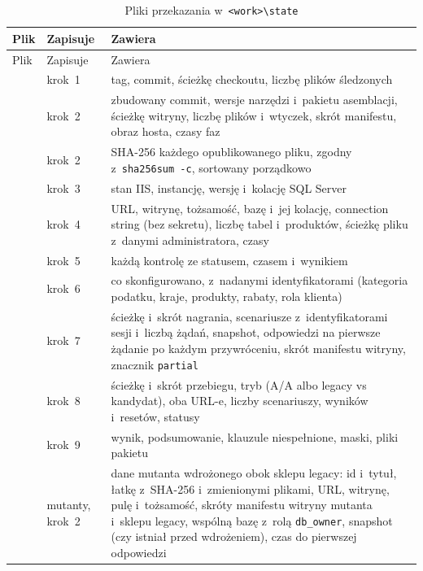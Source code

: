{\footnotesize
\begin{xltabular}{\linewidth}{@{}>{\raggedright\arraybackslash}p{3.4cm} l >{\raggedright\arraybackslash}X@{}}
\caption{Pliki przekazania w~\texttt{<work>\textbackslash{}state}}\label{tab:bench-state}\\
\toprule
Plik & Zapisuje & Zawiera \\
\midrule
\endfirsthead
\toprule
Plik & Zapisuje & Zawiera \\
\midrule
\endhead
\bottomrule
\endlastfoot
{} & krok~1 & tag, commit, ścieżkę checkoutu, liczbę plików śledzonych \\
 & krok~2 & zbudowany commit, wersje narzędzi i~pakietu asemblacji,
  ścieżkę witryny, liczbę plików i~wtyczek, skrót manifestu, obraz hosta, czasy faz \\
 & krok~2 & SHA-256 każdego opublikowanego pliku, zgodny
  z~\texttt{sha256sum -c}, sortowany porządkowo \\
 & krok~3 & stan IIS, instancję, wersję i~kolację SQL Server \\
 & krok~4 & URL, witrynę, tożsamość, bazę i~jej kolację, connection
  string (bez sekretu), liczbę tabel i~produktów, ścieżkę pliku z~danymi administratora,
  czasy \\
 & krok~5 & każdą kontrolę ze statusem, czasem i~wynikiem \\
 & krok~6 & co skonfigurowano, z~nadanymi identyfikatorami
  (kategoria podatku, kraje, produkty, rabaty, rola klienta) \\
 & krok~7 & ścieżkę i~skrót nagrania, scenariusze z~identyfikatorami
  sesji i~liczbą żądań, snapshot, odpowiedzi na pierwsze żądanie po każdym przywróceniu,
  skrót manifestu witryny, znacznik \texttt{partial} \\
 & krok~8 & ścieżkę i~skrót przebiegu, tryb (A/A albo legacy vs
  kandydat), oba URL-e, liczby scenariuszy, wyników i~resetów, statusy \\
 & krok~9 & wynik, podsumowanie, klauzule niespełnione, maski, pliki
  pakietu \\
 & mutanty, krok~2 & dane mutanta wdrożonego obok sklepu legacy:
  id i~tytuł, łatkę z~SHA-256 i~zmienionymi plikami, URL, witrynę, pulę i~tożsamość, skróty
  manifestu witryny mutanta i~sklepu legacy, wspólną bazę z~rolą \texttt{db\_owner},
  snapshot (czy istniał przed wdrożeniem), czas do pierwszej odpowiedzi \\

\end{xltabular}}
